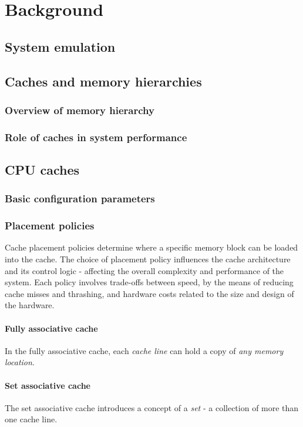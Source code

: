 
\chapter{Background}


\section{System emulation}
%

\section{Caches and memory hierarchies}
\subsection{Overview of memory hierarchy}
\subsection{Role of caches in system performance}
%

\section{CPU caches}
\subsection{Basic configuration parameters}
%
\subsection{Placement policies}
Cache placement policies determine where a specific memory block can be loaded into
the cache. The choice of placement policy influences the cache architecture and
its control logic - affecting the overall complexity and performance of the system.
Each policy involves trade-offs between speed, by the means of reducing cache misses and
thrashing, and hardware costs related to the size and design of the hardware.

\subsubsection{Fully associative cache}
In the fully associative cache, each \textit{cache line} can hold a copy of
\textit{any memory location}.



\subsubsection{Set associative cache}
The set associative cache introduces a concept of a \textit{set} - a collection
of more than one cache line.


